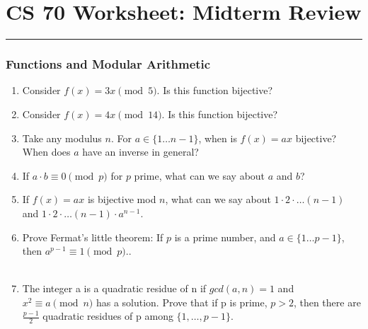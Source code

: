 \documentclass{article}
\begin{document}
\part*{CS 70 Worksheet: Midterm Review}
\vspace{-7pt}
\hrule
\vspace{7pt}

\section{Functions and Modular Arithmetic}
\begin{enumerate}
    \item Consider $f(x) = 3x \pmod 5$. Is this function bijective?
    \begin{solution}
    \end{solution}
    \item Consider $f(x) = 4x \pmod {14}$. Is this function bijective?
    \begin{solution}
    \end{solution}
    \item Take any modulus $n$. For $a \in \{ 1 \ldots n - 1 \}$, when is $f(x) = ax$ bijective? When does $a$ have an inverse in general?
    \begin{solution}
    \end{solution}
    \item If $a \cdot b \equiv 0 \pmod p$ for $p$ prime, what can we say about $a$ and $b$?
    \begin{solution}
    \end{solution}
    \item If $f(x) = ax$ is bijective mod $n$, what can we say about $1 \cdot 2 \cdot \ldots (n - 1)$ and $1 \cdot 2 \cdot \ldots (n - 1) \cdot a^{n-1}$.
    \begin{solution}
    \end{solution}
    \item Prove Fermat's little theorem: If $p$ is a prime number, and $a \in \{ 1 \ldots p - 1 \}$, then $a^{p-1} \equiv 1 \pmod p$..
    \ \\
    \ \\
    \begin{solution}
    \end{solution}
    \item The integer a is a quadratic residue of n if $gcd(a, n) = 1$ and $x^2 \equiv a \pmod n$ has a solution.
    Prove that if p is prime, $p > 2$, then there are $\frac{p-1}{2}$ quadratic residues of p among $\{ 1, \ldots, p - 1 \}$.
    \ \\
    \begin{solution}
    \end{solution}
\end{enumerate}
\end{document}

